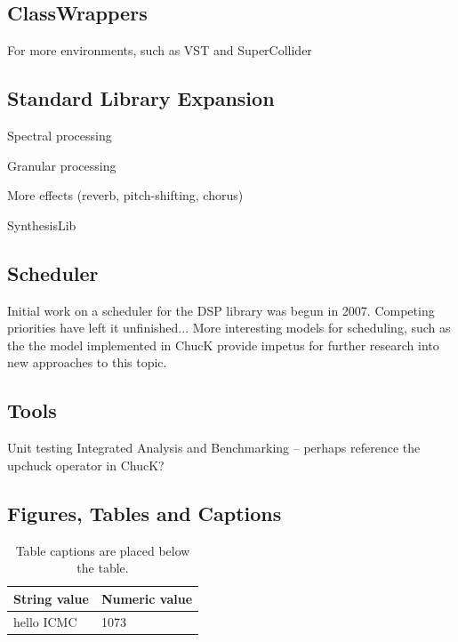 \documentclass[twoside,10pt]{article}
\begin{document}
\subsection{ClassWrappers}

For more environments, such as VST and SuperCollider

\subsection{Standard Library Expansion}

Spectral processing

Granular processing

More effects (reverb, pitch-shifting, chorus)

SynthesisLib

\subsection{Scheduler}

Initial work on a scheduler for the DSP library was begun in 2007.  Competing priorities have left it unfinished...  More interesting models for scheduling, such as the the model implemented in ChucK provide impetus for further research into new approaches to this topic.

\subsection{Tools}
Unit testing
Integrated Analysis and Benchmarking -- perhaps reference the upchuck operator in ChucK?


\subsection{Figures, Tables and Captions}

\begin{table}[htbp]
\begin{center}
\begin{tabular}{|l|l|}
\hline
String value & Numeric value \\
\hline
hello ICMC  & 1073 \\
\hline
\end{tabular}
\end{center}
\caption{Table captions are placed below the table.}
\label{tab:example}
\end{table}
\end{document}
